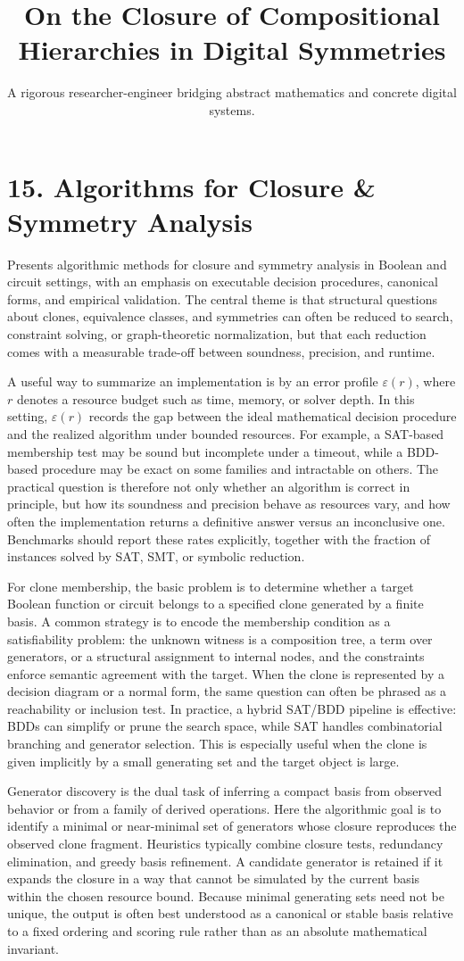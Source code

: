 \documentclass[11pt]{article}
\title{On the Closure of Compositional Hierarchies in Digital Symmetries}
\author{A rigorous researcher-engineer bridging abstract mathematics and concrete digital systems.}
\begin{document}
\section*{15. Algorithms for Closure \& Symmetry Analysis}

Presents algorithmic methods for closure and symmetry analysis in Boolean and circuit settings, with an emphasis on executable decision procedures, canonical forms, and empirical validation. The central theme is that structural questions about clones, equivalence classes, and symmetries can often be reduced to search, constraint solving, or graph-theoretic normalization, but that each reduction comes with a measurable trade-off between soundness, precision, and runtime.

A useful way to summarize an implementation is by an error profile \(\varepsilon(r)\), where \(r\) denotes a resource budget such as time, memory, or solver depth. In this setting, \(\varepsilon(r)\) records the gap between the ideal mathematical decision procedure and the realized algorithm under bounded resources. For example, a SAT-based membership test may be sound but incomplete under a timeout, while a BDD-based procedure may be exact on some families and intractable on others. The practical question is therefore not only whether an algorithm is correct in principle, but how its soundness and precision behave as resources vary, and how often the implementation returns a definitive answer versus an inconclusive one. Benchmarks should report these rates explicitly, together with the fraction of instances solved by SAT, SMT, or symbolic reduction.

For clone membership, the basic problem is to determine whether a target Boolean function or circuit belongs to a specified clone generated by a finite basis. A common strategy is to encode the membership condition as a satisfiability problem: the unknown witness is a composition tree, a term over generators, or a structural assignment to internal nodes, and the constraints enforce semantic agreement with the target. When the clone is represented by a decision diagram or a normal form, the same question can often be phrased as a reachability or inclusion test. In practice, a hybrid SAT/BDD pipeline is effective: BDDs can simplify or prune the search space, while SAT handles combinatorial branching and generator selection. This is especially useful when the clone is given implicitly by a small generating set and the target object is large.

Generator discovery is the dual task of inferring a compact basis from observed behavior or from a family of derived operations. Here the algorithmic goal is to identify a minimal or near-minimal set of generators whose closure reproduces the observed clone fragment. Heuristics typically combine closure tests, redundancy elimination, and greedy basis refinement. A candidate generator is retained if it expands the closure in a way that cannot be simulated by the current basis within the chosen resource bound. Because minimal generating sets need not be unique, the output is often best understood as a canonical or stable basis relative to a fixed ordering and scoring rule rather than as an absolute mathematical invariant.
\end{document}
